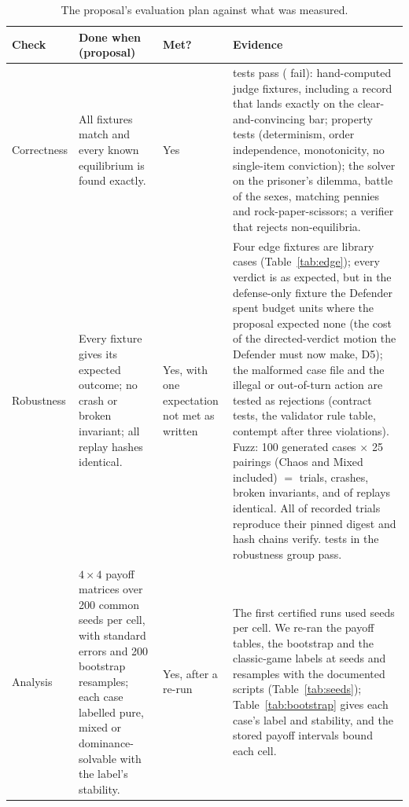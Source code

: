 \begin{table}[ht]\centering\footnotesize
\caption{The proposal's evaluation plan against what was measured.}\label{tab:evalplan}
\begin{tabularx}{\textwidth}{@{}p{1.9cm}p{3.6cm}p{1.3cm}X@{}}
\toprule
\textbf{Check} & \textbf{Done when (proposal)} & \textbf{Met?} & \textbf{Evidence}\\
\midrule
Correctness & All fixtures match and every known equilibrium is found exactly. & Yes & \TestsCorrectness{} tests pass (\TestsFailedCorrectness{} fail): hand-computed judge fixtures, including a record that lands exactly on the clear-and-convincing bar; property tests (determinism, order independence, monotonicity, no single-item conviction); the solver on the prisoner's dilemma, battle of the sexes, matching pennies and rock-paper-scissors; a verifier that rejects non-equilibria.\\
Robustness & Every fixture gives its expected outcome; no crash or broken invariant; all replay hashes identical. & Yes, with one expectation not met as written & Four edge fixtures are library cases (Table~\ref{tab:edge}); every verdict is as expected, but in the defense-only fixture the Defender spent \DefenseOnlySpent{} budget units where the proposal expected none (the cost of the directed-verdict motion the Defender must now make, D5); the malformed case file and the illegal or out-of-turn action are tested as rejections (contract tests, the validator rule table, contempt after three violations). Fuzz: 100 generated cases $\times$ 25 pairings (Chaos and Mixed included) $=$ \StressTrials{} trials, \StressCrashes{} crashes, \StressInvariant{} broken invariants, and \StressReplays{} of \StressTrials{} replays identical. All \ReplaySame{} of \ReplayTotal{} recorded trials reproduce their pinned digest and \ReplayChain{} hash chains verify. \TestsRobustness{} tests in the robustness group pass.\\
Analysis & $4\times4$ payoff matrices over 200 common seeds per cell, with standard errors and 200 bootstrap resamples; each case labelled pure, mixed or dominance-solvable with the label's stability. & Yes, after a re-run & The first certified runs used \BootOldSeeds{} seeds per cell. We re-ran the payoff tables, the bootstrap and the classic-game labels at \BootSeeds{} seeds and \BootResamples{} resamples with the documented scripts (Table~\ref{tab:seeds}); Table~\ref{tab:bootstrap} gives each case's label and stability, and the stored payoff intervals bound each cell.\\

\end{tabularx}
\end{table}
